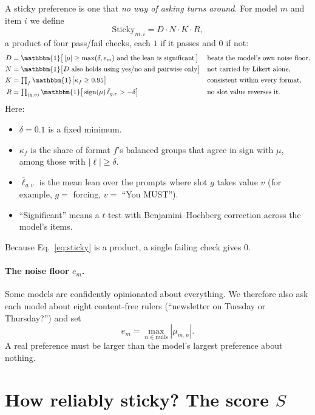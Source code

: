\documentclass[11pt]{article}
\newcommand{\1}{\mathbbm{1}}
\DeclareMathOperator{\sign}{sign}
\begin{document}
\noindent A sticky preference is one that \emph{no way of asking turns around}.
For model $m$ and item $i$ we define
\begin{equation}
  \text{Sticky}_{m,i} = D \cdot N \cdot K \cdot R ,
  \label{eq:sticky}
\end{equation}
a product of four pass/fail checks, each $1$ if it passes and $0$ if not:
\begin{align*}
  D &= \1\big[\,|\mu| \ge \max(\delta, e_m) \text{ and the lean is significant}\,\big]
     && \text{beats the model's own noise floor,}\\
  N &= \1\big[\text{$D$ also holds using yes/no and pairwise only}\big]
     && \text{not carried by Likert alone,}\\
  K &= \textstyle\prod_{f} \1\big[\kappa_f \ge 0.95\big]
     && \text{consistent within every format,}\\
  R &= \textstyle\prod_{(g,v)} \1\big[\sign(\mu)\,\bar\ell_{g,v} > -\delta\big]
     && \text{no slot value reverses it.}
\end{align*}
Here:
\begin{itemize}[leftmargin=1.5em]
  \item $\delta = 0.1$ is a fixed minimum.
  \item $\kappa_f$ is the share of format $f$'s balanced groups that agree in
        sign with $\mu$, among those with $|\ell| \ge \delta$.
  \item $\bar\ell_{g,v}$ is the mean lean over the prompts where slot $g$
        takes value $v$ (for example, $g=$ forcing, $v=$ ``You MUST'').
  \item ``Significant'' means a $t$-test with Benjamini--Hochberg correction
        across the model's items.
\end{itemize}
Because Eq.~\eqref{eq:sticky} is a product, a single failing check gives $0$.

\paragraph{The noise floor $e_m$.} Some models are confidently opinionated
about everything. We therefore also ask each model about eight content-free
rulers (``newsletter on Tuesday or Thursday?'') and set
\begin{equation}
  e_m = \max_{n \in \text{nulls}} |\mu_{m,n}|.
\end{equation}
A real preference must be larger than the model's largest preference about
nothing.

\section{How reliably sticky? The score \texorpdfstring{$S$}{S}}\label{sec:S}
\end{document}
